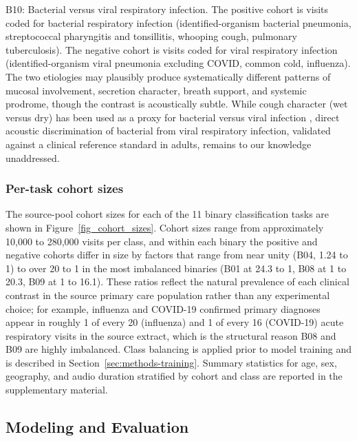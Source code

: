 \documentclass[utf8]{FrontiersinHarvard} %
\begin{document}
B10: Bacterial versus viral respiratory infection. The positive cohort is visits coded for bacterial respiratory infection (identified-organism bacterial pneumonia, streptococcal pharyngitis and tonsillitis, whooping cough, pulmonary tuberculosis). The negative cohort is visits coded for viral respiratory infection (identified-organism viral pneumonia excluding COVID, common cold, influenza). The two etiologies may plausibly produce systematically different patterns of mucosal involvement, secretion character, breath support, and systemic prodrome, though the contrast is acoustically subtle. While cough character (wet versus dry) has been used as a proxy for bacterial versus viral infection \citep{bacterial-vs-viral-voice-literature-absent}, direct acoustic discrimination of bacterial from viral respiratory infection, validated against a clinical reference standard in adults, remains to our knowledge unaddressed.

\subsubsection{Per-task cohort sizes}
\label{sec:cohort-data-distribution}
\label{sec:cohort-distribution}

The source-pool cohort sizes for each of the 11 binary classification tasks are shown in Figure~\ref{fig_cohort_sizes}. Cohort sizes range from approximately 10{,}000 to 280{,}000 visits per class, and within each binary the positive and negative cohorts differ in size by factors that range from near unity (B04, 1.24 to 1) to over 20 to 1 in the most imbalanced binaries (B01 at 24.3 to 1, B08 at 1 to 20.3, B09 at 1 to 16.1). These ratios reflect the natural prevalence of each clinical contrast in the source primary care population rather than any experimental choice; for example, influenza and COVID-19 confirmed primary diagnoses appear in roughly 1 of every 20 (influenza) and 1 of every 16 (COVID-19) acute respiratory visits in the source extract, which is the structural reason B08 and B09 are highly imbalanced. Class balancing is applied prior to model training and is described in Section~\ref{sec:methods-training}. Summary statistics for age, sex, geography, and audio duration stratified by cohort and class are reported in the supplementary material.


\subsection{Modeling and Evaluation}
\label{sec:methods}
\end{document}
